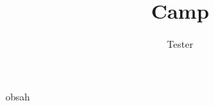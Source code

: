 \documentclass[chorded]{taborovyzpevnik}
\title{Camp}
\author{Tester}
\begin{document}
\begin{songs}{obsah}

	
	
	

\end{songs}
\end{document}

